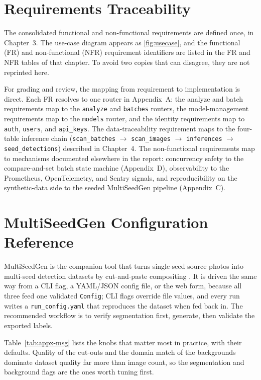 \chapter{Requirements Traceability}
\label{appx:req}

The consolidated functional and non-functional requirements are defined once, in
Chapter~3. The use-case diagram appears as \autoref{fig:usecase}, and the
functional (FR) and non-functional (NFR) requirement identifiers are listed in the
FR and NFR tables of that chapter. To avoid two copies that can disagree, they are
not reprinted here.

For grading and review, the mapping from requirement to implementation is direct.
Each FR resolves to one router in Appendix~A: the analyze and batch requirements
map to the \texttt{analyze} and \texttt{batches} routers, the model-management
requirements map to the \texttt{models} router, and the
identity requirements map to \texttt{auth}, \texttt{users}, and \texttt{api\_keys}.
The data-traceability requirement maps to the four-table inference chain
(\texttt{scan\_batches} $\rightarrow$ \texttt{scan\_images} $\rightarrow$ 
\texttt{inferences} $\rightarrow$ \texttt{seed\_detections}) described in
Chapter~4. The non-functional requirements map to mechanisms documented elsewhere
in the report: concurrency safety to the compare-and-set batch state machine
(Appendix~D), observability to the Prometheus, OpenTelemetry, and Sentry signals,
and reproducibility on the synthetic-data side to the seeded MultiSeedGen pipeline
(Appendix~C).


\chapter{MultiSeedGen Configuration Reference}
\label{appx:msg}

MultiSeedGen is the companion tool that turns single-seed source photos into
multi-seed detection datasets by cut-and-paste compositing
\cite{dwibedi2017cutpaste}. It is driven the same way from a CLI flag, a
YAML/JSON config file, or the web form, because all three feed one validated
\texttt{Config}; CLI flags override file values, and every run writes a
\texttt{run\_config.yaml} that reproduces the dataset when fed back in. The
recommended workflow is to verify segmentation first, generate, then validate the
exported labels.

Table~\ref{tab:appx-msg} lists the knobs that matter most in practice, with their
defaults. Quality of the cut-outs and the domain match of the backgrounds
dominate dataset quality far more than image count, so the segmentation and
background flags are the ones worth tuning first.

